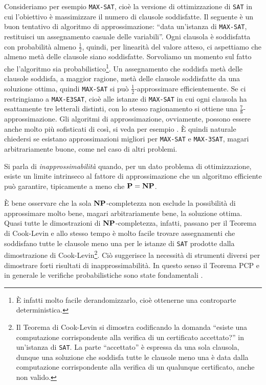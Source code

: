 Consideriamo per esempio \texttt{MAX-SAT}, cioè la versione di ottimizzazione
di \texttt{SAT} in cui l'obiettivo è massimizzare il numero di clausole
soddisfatte.
Il seguente è un buon tentativo di algoritmo di approssimazione:
``data un'istanza di \texttt{MAX-SAT}, restituisci un assegnamento casuale
delle variabili''. Ogni clausola è soddisfatta con probabilità almeno $\frac12$,
quindi, per linearità del valore atteso, ci aspettiamo che almeno metà delle
clausole siano soddisfatte.
Sorvoliamo un momento sul fatto che l'algoritmo sia
probabilistico\footnote{È infatti molto facile derandomizzarlo,
cioè ottenerne una controparte deterministica.}.
Un assegnamento che soddisfa metà delle clausole soddisfa, a maggior
ragione, metà delle clausole soddisfatte da una soluzione ottima, quindi
\texttt{MAX-SAT} si può $\frac12$-approssimare efficientemente.
Se ci restringiamo a \texttt{MAX-E3SAT}, cioè alle istanze di \texttt{MAX-SAT}
in cui ogni clausola ha esattamente tre letterali distinti, con lo
stesso ragionamento si ottiene una $\frac78$-approssimazione.
Gli algoritmi di approssimazione, ovviamente, possono essere anche molto più
sofisticati di così, si veda per esempio \cite{WS11}.
È quindi naturale chiedersi se esistano approssimazioni migliori per
\texttt{MAX-SAT} e \texttt{MAX-3SAT}, magari arbitrariamente buone, come nel
caso di altri problemi.

Si parla di \emph{inapprossimabilità} quando, per un dato problema di
ottimizzazione, esiste un limite intrinseco al fattore di approssimazione che
un algoritmo efficiente può garantire, tipicamente a meno che $\mathbf{P} = \mathbf{NP}$.

È bene osservare che la sola $\mathbf{NP}$-completezza non esclude la possibilità di
approssimare molto bene, magari arbitrariamente bene, la soluzione ottima.
Quasi tutte le dimostrazioni di $\mathbf{NP}$-completezza, infatti, passano per il
Teorema di Cook-Levin e allo stesso tempo è molto facile trovare assegnamenti
che soddisfano tutte le clausole meno una per le istanze di \texttt{SAT}
prodotte dalla dimostrazione di Cook-Levin\footnote{Il Teorema di Cook-Levin
si dimostra codificando la domanda ``esiste una computazione corrispondente alla
verifica di un certificato accettato?'' in un'istanza di \texttt{SAT}.
La parte ``accettato'' è espressa da una sola clausola, dunque una soluzione
che soddisfa tutte le clausole meno una è data dalla computazione
corrispondente alla verifica di un qualunque certificato, anche non valido.}.
Ciò suggerisce la necessità di strumenti diversi per dimostrare forti
risultati di inapprossimabilità. In questo senso il Teorema PCP e in generale
le verifiche probabilistiche sono state fondamentali \cite{Tre04, FGLSS96}.

